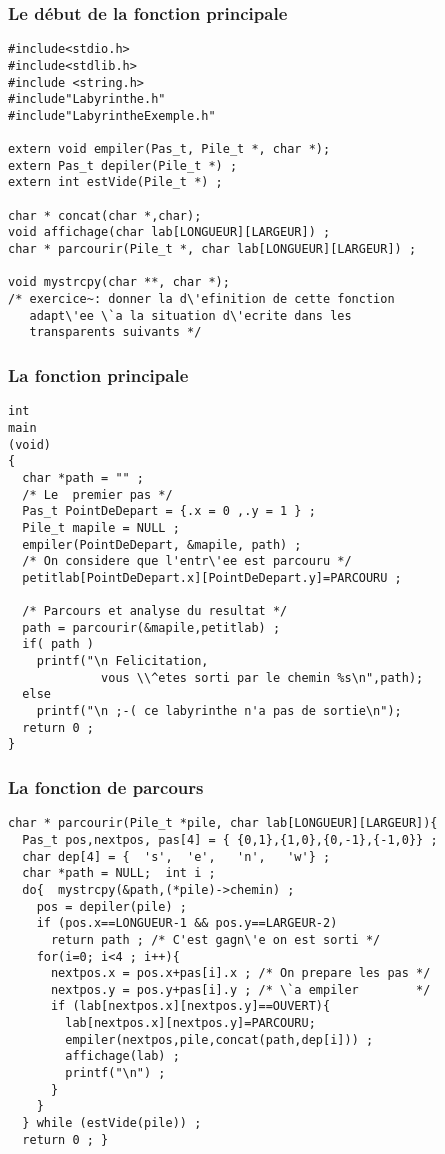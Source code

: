 \begin{frame}[fragile]
  \frametitle{Le d\'ebut de la fonction principale}%
\begin{verbatim}
#include<stdio.h>
#include<stdlib.h>
#include <string.h>
#include"Labyrinthe.h"
#include"LabyrintheExemple.h"

extern void empiler(Pas_t, Pile_t *, char *);
extern Pas_t depiler(Pile_t *) ;
extern int estVide(Pile_t *) ;

char * concat(char *,char);
void affichage(char lab[LONGUEUR][LARGEUR]) ;
char * parcourir(Pile_t *, char lab[LONGUEUR][LARGEUR]) ;

void mystrcpy(char **, char *);
/* exercice~: donner la d\'efinition de cette fonction
   adapt\'ee \`a la situation d\'ecrite dans les 
   transparents suivants */
\end{verbatim}
\end{frame}
\begin{frame}[fragile]
  \frametitle{La fonction principale}%
\begin{verbatim}
int 
main
(void)
{
  char *path = "" ;
  /* Le  premier pas */
  Pas_t PointDeDepart = {.x = 0 ,.y = 1 } ;
  Pile_t mapile = NULL ; 
  empiler(PointDeDepart, &mapile, path) ;
  /* On considere que l'entr\'ee est parcouru */
  petitlab[PointDeDepart.x][PointDeDepart.y]=PARCOURU ;

  /* Parcours et analyse du resultat */
  path = parcourir(&mapile,petitlab) ;
  if( path )
    printf("\n Felicitation, 
             vous \\^etes sorti par le chemin %s\n",path); 
  else
    printf("\n ;-( ce labyrinthe n'a pas de sortie\n"); 
  return 0 ;
}
\end{verbatim}
\end{frame}
\begin{frame}[fragile]
  \frametitle{La fonction de parcours}%
\begin{verbatim}
char * parcourir(Pile_t *pile, char lab[LONGUEUR][LARGEUR]){
  Pas_t pos,nextpos, pas[4] = { {0,1},{1,0},{0,-1},{-1,0}} ;
  char dep[4] = {  's',  'e',   'n',   'w'} ;
  char *path = NULL;  int i ;
  do{  mystrcpy(&path,(*pile)->chemin) ;
    pos = depiler(pile) ;
    if (pos.x==LONGUEUR-1 && pos.y==LARGEUR-2)
      return path ; /* C'est gagn\'e on est sorti */
    for(i=0; i<4 ; i++){
      nextpos.x = pos.x+pas[i].x ; /* On prepare les pas */
      nextpos.y = pos.y+pas[i].y ; /* \`a empiler        */       
      if (lab[nextpos.x][nextpos.y]==OUVERT){ 
        lab[nextpos.x][nextpos.y]=PARCOURU; 
        empiler(nextpos,pile,concat(path,dep[i])) ;
        affichage(lab) ;
        printf("\n") ;
      }
    }
  } while (estVide(pile)) ;
  return 0 ; }
\end{verbatim}
\end{frame}

